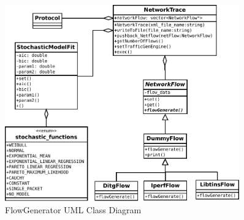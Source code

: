 \begin{figure}[]
	\centering
	\includegraphics[width=0.9\textwidth]{figures/apD/flow-generator}
	\caption{FlowGenerator UML Class Diagram}
	\label{fig:uml-flow-generator}
\end{figure}


